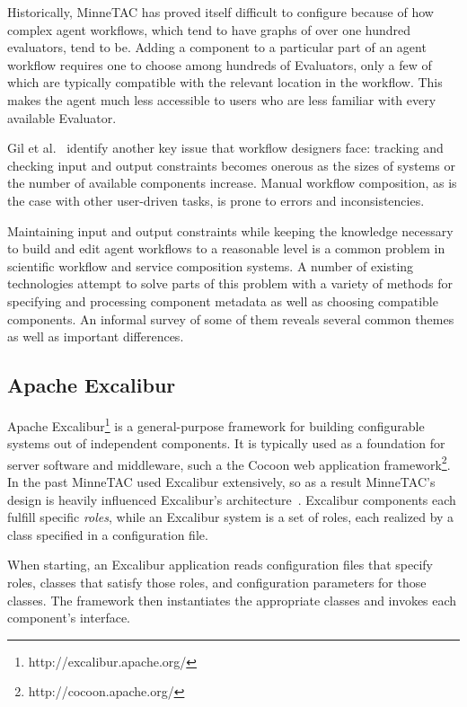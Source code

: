 \documentclass{article}
\begin{document}
Historically, MinneTAC has proved itself difficult to configure because of how complex agent workflows, which tend to have graphs of over one hundred evaluators, tend to be.
Adding a component to a particular part of an agent workflow requires one to choose among hundreds of Evaluators, only a few of which are typically compatible with the relevant location in the workflow.
This makes the agent much less accessible to users who are less familiar with every available Evaluator.

Gil et al.~\cite{gil2010wings} identify another key issue that workflow designers face:  tracking and checking input and output constraints becomes onerous as the sizes of systems or the number of available components increase.
Manual workflow composition, as is the case with other user-driven tasks, is prone to errors and inconsistencies.

Maintaining input and output constraints while keeping the knowledge necessary to build and edit agent workflows to a reasonable level is a common problem in scientific workflow and service composition systems.
A number of existing technologies attempt to solve parts of this problem with a variety of methods for specifying and processing component metadata as well as choosing compatible components.
An informal survey of some of them reveals several common themes as well as important differences.

\subsection{Apache Excalibur}

Apache Excalibur\footnote{http://excalibur.apache.org/} is a general-purpose framework for building configurable systems out of independent components.
It is typically used as a foundation for server software and middleware, such a the Cocoon web application framework\footnote{http://cocoon.apache.org/}.
In the past MinneTAC used Excalibur extensively, so as a result MinneTAC's design is heavily influenced Excalibur's architecture~\cite{Collins08ECRA}.
Excalibur components each fulfill specific \emph{roles}, while an Excalibur system is a set of roles, each realized by a class specified in a configuration file.

When starting, an Excalibur application reads configuration files that specify roles, classes that satisfy those roles, and configuration parameters for those classes.
The framework then instantiates the appropriate classes and invokes each component's interface.
\end{document}
